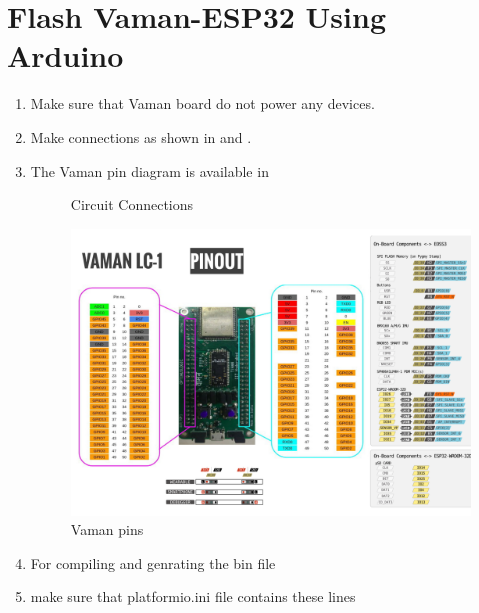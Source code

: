 \section{Flash Vaman-ESP32 Using Arduino}
\renewcommand{\theequation}{\theenumi}
\renewcommand{\thefigure}{\theenumi}
\begin{enumerate}[label=\thesection.\arabic*.,ref=\thesection.\theenumi]
\item Make sure that Vaman board do not power any devices.  
\item Make connections as shown in  and  . 
\item The Vaman pin diagram is available in 
\begin{figure}[!ht]
\centering

\caption{Circuit Connections}
\label{fig:vaman/uart/1}
\end{figure}
\begin{figure}
\centering
\includegraphics[width=\columnwidth]{vaman-esp32/lcd/figs/pin_sheet.png}
\caption{Vaman pins}
\label{fig:vaman-pin_sheet}
\end{figure}
\begin{table}[!ht]

\caption{}
\label{tab:arduino-uart}
\end{table}
\item For compiling and genrating the bin file 
\item make sure that platformio.ini file contains these lines
\begin{lstlisting}

\end{lstlisting}
\end{enumerate}
